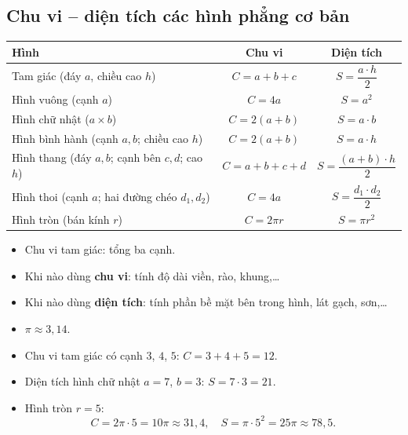 \documentclass[12pt,a4paper]{article}
\begin{document}
\subsection{Chu vi -- diện tích các hình phẳng cơ bản}

\begin{congthuc}[title={Chu vi và diện tích}]
\renewcommand{\arraystretch}{1.8}
\begin{center}
\begin{tabular}{|l|c|c|}
\hline
\textbf{Hình} & \textbf{Chu vi} & \textbf{Diện tích} \\
\hline
Tam giác (đáy $a$, chiều cao $h$) & $C = a + b + c$ & $S = \dfrac{a \cdot h}{2}$ \\
\hline
Hình vuông (cạnh $a$) & $C = 4a$ & $S = a^2$ \\
\hline
Hình chữ nhật ($a \times b$) & $C = 2(a + b)$ & $S = a \cdot b$ \\
\hline
Hình bình hành (cạnh $a, b$; chiều cao $h$) & $C = 2(a + b)$ & $S = a \cdot h$ \\
\hline
Hình thang (đáy $a, b$; cạnh bên $c, d$; cao $h$) & $C = a + b + c + d$ & $S = \dfrac{(a + b) \cdot h}{2}$ \\
\hline
Hình thoi (cạnh $a$; hai đường chéo $d_1, d_2$) & $C = 4a$ & $S = \dfrac{d_1 \cdot d_2}{2}$ \\
\hline
Hình tròn (bán kính $r$) & $C = 2\pi r$ & $S = \pi r^2$ \\
\hline
\end{tabular}
\end{center}
\end{congthuc}

\begin{luuy}
\begin{itemize}
  \item Chu vi tam giác: tổng ba cạnh.
  \item Khi nào dùng \textbf{chu vi}: tính độ dài viền, rào, khung,\ldots
  \item Khi nào dùng \textbf{diện tích}: tính phần bề mặt bên trong hình, lát gạch, sơn,\ldots
  \item $\pi \approx 3{,}14$.
\end{itemize}
\end{luuy}

\begin{vidu}
\begin{itemize}
  \item Chu vi tam giác có cạnh $3$, $4$, $5$: $C = 3 + 4 + 5 = 12$.
  \item Diện tích hình chữ nhật $a = 7$, $b = 3$: $S = 7 \cdot 3 = 21$.
  \item Hình tròn $r = 5$:
    \[C = 2\pi \cdot 5 = 10\pi \approx 31{,}4, \quad S = \pi \cdot 5^2 = 25\pi \approx 78{,}5.\]
\end{itemize}
\end{vidu}
\end{document}
